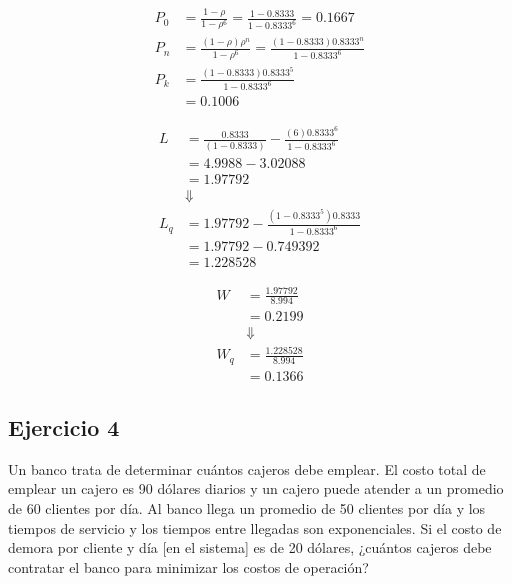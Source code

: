\documentclass{templateNote}
\begin{document}
\begin{mdframed}
    \begin{align*}
        P_0 &= \frac{1-\rho}{1-\rho^6} = \frac{1-0.8333}{1-0.8333^6} = 0.1667 \\
        P_n &= \frac{(1-\rho)\rho^n}{1-\rho^6} = \frac{(1-0.8333)0.8333^n}{1-0.8333^6} \\
        P_k &= \frac{(1-0.8333)0.8333^5}{1-0.8333^6} \\
        &= 0.1006
    \end{align*}
\end{mdframed}      

\begin{mdframed}
    \begin{align*}
        L &= \frac{0.8333}{(1-0.8333)} - \frac{(6)0.8333^{6}}{1-0.8333^6} \\
        &= 4.9988 - 3.02088 \\
        &= 1.97792 \\
        &\Downarrow \\
        L_q &= 1.97792 - \frac{(1-0.8333^5)0.8333}{1-0.8333^6} \\
        &= 1.97792 - 0.749392 \\
        &= 1.228528
    \end{align*}
\end{mdframed}

\newpage
\begin{mdframed}
\begin{align*}
    W &= \frac{1.97792}{8.994}\\
    &= 0.2199 \\
    &\Downarrow \\
    W_q &= \frac{1.228528}{8.994} \\
    &= 0.1366
\end{align*}
\end{mdframed}

\newpage

\subsection{Ejercicio 4}
\noindent Un banco trata de determinar cuántos cajeros debe emplear. El costo total de emplear un cajero es 90 dólares diarios y un cajero puede atender a un promedio de 60 clientes por día. Al banco llega un promedio de 50 clientes por día y los tiempos de servicio y los tiempos entre llegadas son exponenciales. Si el costo de demora por cliente y día [en el sistema] es de 20 dólares, ¿cuántos cajeros debe contratar el banco para minimizar los costos de operación?
\end{document}
